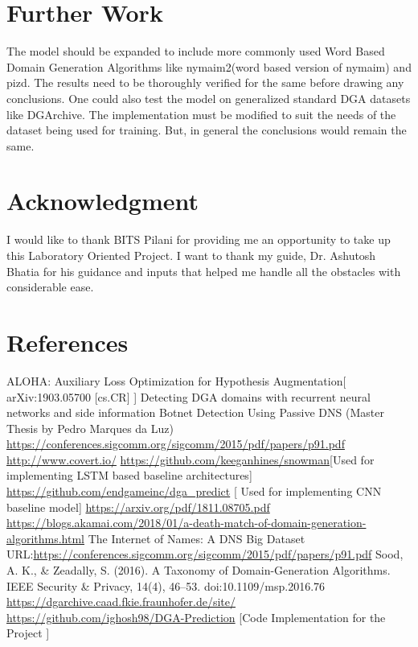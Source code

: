 \documentclass[conference]{IEEEtran}
\begin{document}
\section{Further Work}
The model should be expanded to include more commonly used Word Based Domain Generation Algorithms like nymaim2(word based version of nymaim) and pizd. The results need to be thoroughly verified for the same before drawing any conclusions. One could also test the model on generalized standard DGA datasets like DGArchive. The implementation must be modified to suit the needs of the dataset being used for training. But, in general the conclusions would remain the same.
\section*{Acknowledgment}
I would like to thank BITS Pilani for providing me an opportunity to take up this Laboratory
Oriented Project. I want to thank my guide, Dr. Ashutosh Bhatia for his guidance and inputs that helped me handle all the obstacles with considerable ease.


% 
% 


\section{References}
\begin{thebibliography}{00}
 ALOHA: Auxiliary Loss Optimization for Hypothesis Augmentation[ arXiv:1903.05700 [cs.CR] ]
 Detecting DGA domains with recurrent neural networks and side information
 Botnet Detection Using Passive DNS (Master Thesis by Pedro Marques da Luz)
 \url{https://conferences.sigcomm.org/sigcomm/2015/pdf/papers/p91.pdf}
 \url{http://www.covert.io/}
 \url{https://github.com/keeganhines/snowman}[Used for implementing LSTM based baseline architectures]
 \url{https://github.com/endgameinc/dga_predict} [ Used for implementing CNN baseline model]
 \url{https://arxiv.org/pdf/1811.08705.pdf}
 \url{https://blogs.akamai.com/2018/01/a-death-match-of-domain-generation-algorithms.html}
 The Internet of Names: A DNS Big Dataset URL:\url{https://conferences.sigcomm.org/sigcomm/2015/pdf/papers/p91.pdf}
  Sood, A. K., & Zeadally, S. (2016). A Taxonomy of Domain-Generation Algorithms. IEEE Security & Privacy, 14(4), 46–53. doi:10.1109/msp.2016.76
 \url{https://dgarchive.caad.fkie.fraunhofer.de/site/}
\url{https://github.com/ighosh98/DGA-Prediction} [Code Implementation for the Project ]
\end{thebibliography}
\vspace{12pt}
\end{document}
